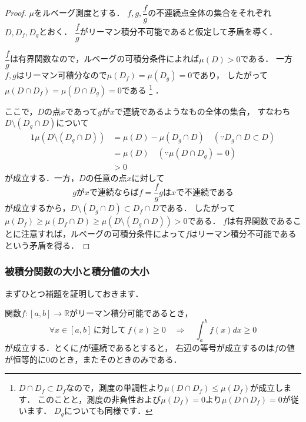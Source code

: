 \documentclass[./index]{subfiles}
\begin{document}
\begin{proof}
    $\mu$をルベーグ測度とする．
    $f, g, \dfrac{f}{g}$の不連続点全体の集合をそれぞれ$D, D_f, D_g$とおく．
    $\dfrac{f}{g}$がリーマン積分不可能であると仮定して矛盾を導く．

    $\dfrac{f}{g}$は有界関数なので，ルベーグの可積分条件によれば$\mu(D) > 0$である．
    一方$f, g$はリーマン可積分なので$\mu(D_f) = \mu(D_g) = 0$であり，
    したがって$\mu(D \cap D_f) = \mu(D \cap D_g) = 0$である
    \footnote{
        $D \cap D_f \subset D_f$なので，測度の単調性より$\mu(D \cap D_f) \le \mu(D_f)$が成立します．
        このことと，測度の非負性および$\mu(D_f) = 0$より$\mu(D \cap D_f) = 0$が従います．
        $D_g$についても同様です．
    }
    ．

    ここで，$D$の点$x$であって$g$が$x$で連続であるようなもの全体の集合，
    すなわち$D \setminus (D_g \cap D)$について
    \begin{alignat}{1}
        \mu(D \setminus (D_g \cap D)) &= \mu(D) - \mu(D_g \cap D) \quad (\because D_g \cap D \subset D) \\
        &= \mu(D) \quad (\because \mu(D \cap D_g) = 0)\\
        &> 0
    \end{alignat}
    が成立する．一方，$D$の任意の点$x$に対して
    \begin{equation}
        \mbox{$g$が$x$で連続ならば$f = \dfrac{f}{g} g$は$x$で不連続である}
    \end{equation}
    が成立するから，$D \setminus (D_g \cap D) \subset D_f \cap D$である．
    したがって$\mu(D_f) \ge \mu(D_f \cap D) \ge \mu(D \setminus (D_g \cap D)) > 0$である．
    $f$は有界関数であることに注意すれば，ルベーグの可積分条件によって$f$はリーマン積分不可能であるという矛盾を得る．
\end{proof}

\subsubsection{被積分関数の大小と積分値の大小}

まずひとつ補題を証明しておきます．

\begin{screen}
    \begin{lemma}
        \label{lemma:3}
        関数$f: [a, b] \rightarrow \mathbb{R}$がリーマン積分可能であるとき，
        \begin{equation}
            \label{lemma:3:1}
            \forall x \in [a, b] \,\mbox{に対して}\, f(x) \ge 0
            \quad \Longrightarrow \quad
            \int_a^b f(x) dx \ge 0
        \end{equation}
        が成立する．とくに$f$が連続であるとすると，
        右辺の等号が成立するのは$f$の値が恒等的に$0$のとき，またそのときのみである．
    \end{lemma}
\end{screen}
\end{document}
